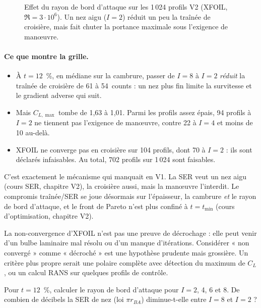 \begin{figure}[htbp]
\centering

\caption{Effet du rayon de bord d'attaque sur les 1\,024 profils V2 (XFOIL, $\Re=3\cdot10^6$). Un nez aigu ($I=2$) réduit un peu la traînée de croisière, mais fait chuter la portance maximale sous l'exigence de manœuvre.}\label{fig:v2-xfoil}
\end{figure}

\paragraph{Ce que montre la grille.}
\begin{itemize}
\item À $t=12$~\%, en médiane sur la cambrure, passer de $I=8$ à $I=2$ \emph{réduit} la traînée de croisière de 61 à 54~counts : un nez plus fin limite la survitesse et le gradient adverse qui suit.
\item Mais $C_{L,\max}$ tombe de 1,63 à 1,01. Parmi les profils assez épais, 94 profils à $I=2$ ne tiennent pas l'exigence de manœuvre, contre 22 à $I=4$ et moins de 10 au-delà.
\item XFOIL ne converge pas en croisière sur 104 profils, dont 70 à $I=2$ : ils sont déclarés infaisables. Au total, 702 profils sur 1\,024 sont faisables.
\end{itemize}

\begin{projet}
C'est exactement le mécanisme qui manquait en V1. La SER veut un nez aigu (cours SER, chapitre V2), la croisière aussi, mais la manœuvre l'interdit. Le compromis traînée/SER se joue désormais sur l'épaisseur, la cambrure \emph{et} le rayon de bord d'attaque, et le front de Pareto n'est plus confiné à $t=t_{\min}$ (cours d'optimisation, chapitre V2).
\end{projet}

\begin{piege}
La non-convergence d'XFOIL n'est pas une preuve de décrochage : elle peut venir d'un bulbe laminaire mal résolu ou d'un manque d'itérations. Considérer « non convergé » comme « décroché » est une hypothèse prudente mais grossière. Un critère plus propre serait une polaire complète avec détection du maximum de $C_L$, ou un calcul RANS sur quelques profils de contrôle.
\end{piege}

\exercices
\begin{exercice}
Pour $t=12$~\%, calculer le rayon de bord d'attaque pour $I=2$, 4, 6 et 8. De combien de décibels la SER de nez (loi $\pi r_{BA}$) diminue-t-elle entre $I=8$ et $I=2$ ?
\end{exercice}

